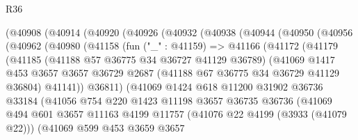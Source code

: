 \begin{lexlean}{R36}
\begin{coremodule}
          (@40908
            (@40914
              (@40920
                (@40926
                  (@40932
                    (@40938
                      (@40944
                        (@40950
                          (@40956
                            (@40962
                              (@40980
                                (@41158
                                  (fun ("_" : @41159) =>
                                  @41166
                                    (@41172
                                      (@41179
                                        (@41185
                                          (@41188 @57 @36775 @34 @36727 @41129 @36789)
                                          (@41069
                                            @1417
                                            @453
                                            @3657
                                            @3657
                                            @36729
                                            @2687
                                            (@41188 @67 @36775 @34 @36729 @41129 @36804)
                                            @41141))
                                        @36811)
                                      (@41069
                                        @1424
                                        @618
                                        @11200
                                        @31902
                                        @36736
                                        @33184
                                        (@41056
                                          @754
                                          @220
                                          @1423
                                          @11198
                                          @3657
                                          @36735
                                          @36736
                                          (@41069
                                            @494
                                            @601
                                            @3657
                                            @11163
                                            @4199
                                            @11757
                                            (@41076 @22 @4199 (@3933 (@41079 @22)))
                                            (@41069
                                              @599
                                              @453
                                              @3659
                                              @3657

\end{coremodule}
\end{lexlean}

